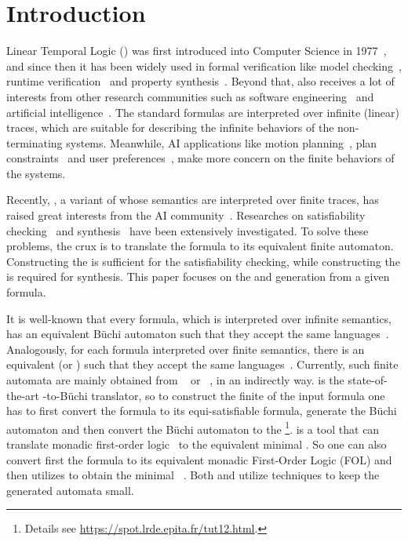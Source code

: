 \section{Introduction}

Linear Temporal Logic (\ltl) was first introduced into Computer Science in 1977~\cite{Pnu77}, and since then it has been widely used in formal verification like model checking~\cite{CGD99}, runtime verification~\cite{BLS11} and property synthesis~\cite{JGWB07,BFJ12}. Beyond that, \ltl also receives a lot of interests from other research communities such as software engineering~\cite{BKMR15} and artificial intelligence~\cite{BK98}. The standard \ltl formulas are interpreted over infinite (linear) traces, which are suitable for describing the infinite behaviors of the non-terminating systems. Meanwhile, AI applications like motion planning~\cite{BK98,DV99,CDV02,PLGG11,CBMM17}, plan constraints~\cite{BK00,Gab04} and user preferences~\cite{BFM06,BFM11,SBM11}, make more concern on the finite behaviors of the systems. 

Recently, \ltlf, a variant of \ltl whose semantics are interpreted over finite traces, has raised great interests from the AI community~\cite{GV13,GV15}. Researches on \ltlf satisfiability checking~\cite{LZPVH14,LRPZV19} and \ltlf synthesis~\cite{GV15,ZTLPV17,CMBM18} have been extensively investigated. To solve these problems, the crux is to translate the \ltlf formula to its equivalent finite automaton. Constructing the \NFA is sufficient for the satisfiability checking, while constructing the \DFA is required for \ltlf synthesis. This paper focuses on the \NFA and \DFA generation from a given \ltlf formula. 

It is well-known that every \ltl formula, which is interpreted over infinite semantics, has an equivalent B\"uchi automaton such that they accept the same languages~\cite{GPVW95}. Analogously, for each \ltlf formula interpreted over finite semantics, there is an equivalent \NFA (or \DFA) such that they accept the same languages~\cite{GV15}. Currently, such finite automata are mainly obtained from \spot~\cite{DP04} or \mona~\cite{HJJKPRS95,EKM98}, in an indirectly way. \spot is the state-of-the-art \ltl-to-B\"uchi translator, so to construct the finite \NFA of the input \ltlf formula one has to first convert the \ltlf formula to its equi-satisfiable \ltl formula, generate the B\"uchi automaton and then convert the B\"uchi automaton to the \NFA\footnote{Details see \url{https://spot.lrde.epita.fr/tut12.html}.}. \mona is a tool that can translate monadic first-order logic~\cite{Tra62} to the equivalent minimal \DFA. So one can also convert first the \ltlf formula to its equivalent monadic First-Order Logic (FOL) and then utilizes \mona to obtain the minimal \DFA~\cite{ZTLPV17}. Both \spot and \mona utilize \BDD techniques to keep the generated automata small. 

